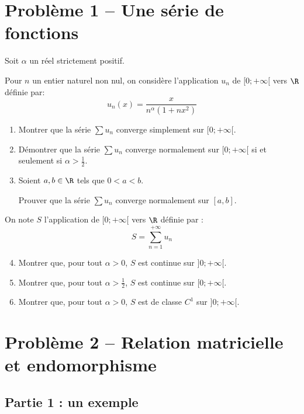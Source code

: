 \documentclass[twoside,french,11pt]{VcCours}
\begin{document}
\vspace{1cm}
\section*{Problème 1 -- Une série de fonctions} %
Soit $\alpha$ un réel strictement positif.

Pour $n$ un entier naturel non nul, on considère l'application $u_n$ de
$[0;+\infty[$ vers $\R$ définie par:
\[u_n(x)=\frac{x}{n^{\alpha}(1+nx^2)}\]
  \begin{enumerate}
    \item Montrer que la série $\sum u_n$ converge simplement sur $[0;+\infty[$.
    \item Démontrer que la série $\sum u_n$ converge normalement sur $[0;+\infty[$
    si et seulement si $\alpha>\frac{1}{2}$.
    \item Soient $a,b\in\R$ tels que $0<a<b$.
    
    Prouver que la série $\sum u_n$ converge normalement sur $[a,b]$.
\end{enumerate}

On note $S$ l'application de $[0;+\infty[$ vers $\R$ définie par :
\[S=\sum_{n=1}^{+\infty}u_n\]

\begin{enumerate}\setcounter{enumi}{3}
  \item Montrer que, pour tout $\alpha>0$, $S$ est continue sur $]0;+\infty[$.
  \item Montrer que, pour tout $\alpha>\tfrac12$, $S$ est continue sur $[0;+\infty[$.
  \item Montrer que, pour tout $\alpha>0$, $S$ est de classe $C^1$ sur $]0;+\infty[$.
\end{enumerate}


\vspace{1cm}
\section*{Problème 2 -- Relation matricielle et endomorphisme}

\subsection*{Partie 1 : un exemple}
\end{document}
